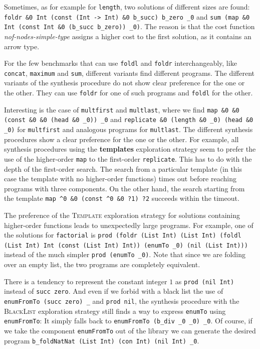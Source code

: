 Sometimes, as for example for \lstinline?length?, two solutions of different sizes are found: \lstinline?foldr &0 Int (const (Int -> Int) &0 b_succ) b_zero _0? and \lstinline?sum (map &0 Int (const Int &0 (b_succ b_zero)) _0)?. The reason is that the cost function \textit{nof-nodes-simple-type} assigns a higher cost to the first solution, as it contains an arrow type.

For the few benchmarks that can use \lstinline?foldl? and \lstinline?foldr? interchangeably, like \lstinline?concat?, \lstinline?maximum? and \lstinline?sum?, different variants find different programs. The different variants of the synthesis procedure do not show clear preference for the one or the other. They can use \lstinline?foldr? for one of such programs and \lstinline?foldl? for the other.

Interesting is the case of \lstinline?multfirst? and \lstinline?multlast?, where we find \lstinline?map &0 &0 (const &0 &0 (head &0 _0)) _0? and \lstinline?replicate &0 (length &0 _0) (head &0 _0)? for \lstinline?multfirst? and analogous programs for \lstinline?multlast?. The different synthesis procedures show a clear preference for the one or the other. For example, all synthesis procedures using the \textbf{templates} exploration strategy seem to prefer the use of the higher-order \lstinline?map? to the first-order \lstinline?replicate?. This has to do with the depth of the first-order search. The search from a particular template (in this case the template with no higher-order functions) times out before reaching programs with three components. On the other hand, the search starting from the template \lstinline!map ^0 &0 (const ^0 &0 ?1) ?2! succeeds within the timeout.

The preference of the \textsc{Template} exploration strategy for solutions containing higher-order functions leads to unexpectedly large programs. For example, one of the solutions for \lstinline?factorial? is \lstinline?prod (foldr (List Int) (List Int) (foldl (List Int) Int (const (List Int) Int)) (enumTo _0) (nil (List Int)))? instead of the much simpler \lstinline?prod (enumTo _0)?. Note that since we are folding over an empty list, the two programs are completely equivalent.

There is a tendency to represent the constant integer $1$ as \lstinline?prod (nil Int)? instead of \lstinline?succ zero?. And even if we forbid with a black list the use of \lstinline?enumFromTo (succ zero) _? and \lstinline?prod nil?, the synthesis procedure with the \textsc{BlackList} exploration strategy still finds a way to express \lstinline?enumTo? using \lstinline?enumFromTo?: It simply falls back to \lstinline?enumFromTo (b_div _0 _0) _0?. Of course, if we take the component \lstinline?enumFromTo? out of the library we can generate the desired program \lstinline?b_foldNatNat (List Int) (con Int) (nil Int) _0?.

